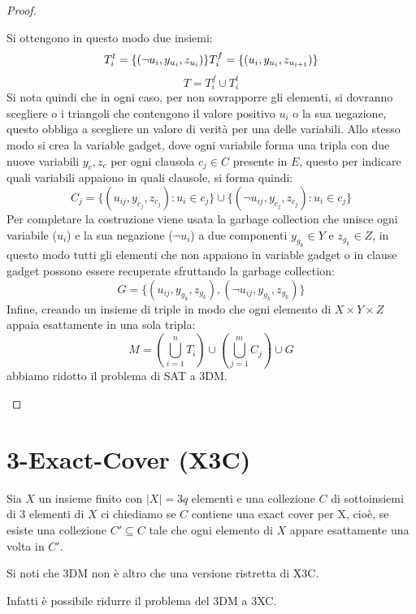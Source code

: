 \begin{proof}
\begin{itemize}
\begin{figure}[H]
        \end{figure}
        Si ottengono in questo modo due insiemi: 
        $$
        T_i^t = \{(\lnot u_i, y_{u_i}, z_{u_i})\} \\
        T_i^f = \{(u_i, y_{u_i}, z_{u_{i+1}})\} \\
        $$
        $$
        T = T_i^f \cup T_i^t
        $$
        Si nota quindi che in ogni caso, per non sovrapporre gli elementi, si dovranno scegliere o i triangoli che contengono il valore positivo $u_i$ o la sua negazione, questo obbliga a scegliere un valore di verità per una delle variabili. 
        Allo stesso modo si crea la variable gadget, dove ogni variabile forma una tripla con due nuove variabili $y_c, z_c$ per ogni clausola $c_j \in C$ presente in $E$, questo per indicare quali variabili appaiono in quali clausole, si forma quindi: 
        $$
        C_j = \{(u_{ij},y_{c_j}, z_{c_j}): u_i \in c_j\} \cup \{(\lnot u_{ij},y_{c_j}, z_{c_j}): u_i \in c_j\}
        $$
        Per completare la costruzione viene usata la garbage collection che unisce ogni variabile ($u_i$) e la sua negazione ($\lnot u_i$) a due componenti $y_{g_k}\in Y$ e $z_{g_k}\in Z$, in questo modo tutti gli elementi che non appaiono in variable gadget o in clause gadget possono essere recuperate sfruttando la garbage collection: 
        $$
        G = \{(u_{ij},y_{g_k}, z_{g_k}), (\lnot u_{ij}, y_{g_k}, z_{g_k})\}
        $$
        Infine, creando un insieme di triple in modo che ogni elemento di $X \times Y \times Z$ appaia esattamente in una sola tripla:
        $$
        M = (\bigcup_{i=1}^{n}T_i) \cup (\bigcup_{j=1}^mC_j) \cup G
        $$
        abbiamo ridotto il problema di SAT a 3DM. 
    \end{itemize}
\end{proof}

\section{3-Exact-Cover (X3C)}
Sia $X$ un insieme finito con $|X|=3q$ elementi e una collezione $C$ di sottoinsiemi di 3 elementi di $X$ ci chiediamo se $C$ contiene una exact cover per X, cioè, se esiste una collezione $C' \subseteq C$ tale che ogni elemento di $X$ appare esattamente una volta in $C'$.

Si noti che 3DM non è altro che una versione ristretta di X3C.

Infatti è possibile ridurre il problema del 3DM a 3XC.

